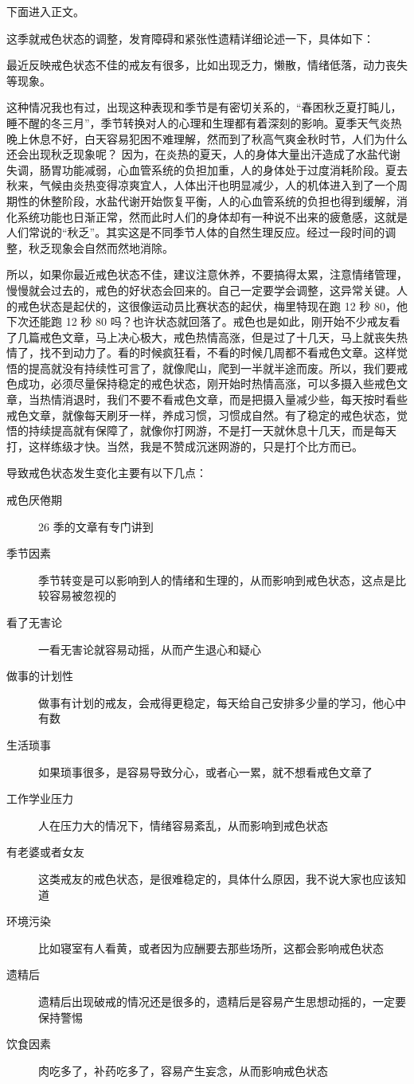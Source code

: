 \documentclass{ctexart}
\begin{document}
下面进入正文。

这季就戒色状态的调整，发育障碍和紧张性遗精详细论述一下，具体如下：

最近反映戒色状态不佳的戒友有很多，比如出现乏力，懒散，情绪低落，动力丧失等现象。

这种情况我也有过，出现这种表现和季节是有密切关系的，“春困秋乏夏打盹儿，睡不醒的冬三月”，季节转换对人的心理和生理都有着深刻的影响。夏季天气炎热晚上休息不好，白天容易犯困不难理解，然而到了秋高气爽金秋时节，人们为什么还会出现秋乏现象呢？ 因为，在炎热的夏天，人的身体大量出汗造成了水盐代谢失调，肠胃功能减弱，心血管系统的负担加重，人的身体处于过度消耗阶段。夏去秋来，气候由炎热变得凉爽宜人，人体出汗也明显减少，人的机体进入到了一个周期性的休整阶段，水盐代谢开始恢复平衡，人的心血管系统的负担也得到缓解，消化系统功能也日渐正常，然而此时人们的身体却有一种说不出来的疲惫感，这就是人们常说的“秋乏”。其实这是不同季节人体的自然生理反应。经过一段时间的调整，秋乏现象会自然而然地消除。

所以，如果你最近戒色状态不佳，建议注意休养，不要搞得太累，注意情绪管理，慢慢就会过去的，戒色的好状态会回来的。自己一定要学会调整，这异常关键。人的戒色状态是起伏的，这很像运动员比赛状态的起伏，梅里特现在跑 12 秒 80，他下次还能跑 12 秒 80 吗？也许状态就回落了。戒色也是如此，刚开始不少戒友看了几篇戒色文章，马上决心极大，戒色热情高涨，但是过了十几天，马上就丧失热情了，找不到动力了。看的时候疯狂看，不看的时候几周都不看戒色文章。这样觉悟的提高就没有持续性可言了，就像爬山，爬到一半就半途而废。所以，我们要戒色成功，必须尽量保持稳定的戒色状态，刚开始时热情高涨，可以多摄入些戒色文章，当热情消退时，我们不要不看戒色文章，而是把摄入量减少些，每天按时看些戒色文章，就像每天刷牙一样，养成习惯，习惯成自然。有了稳定的戒色状态，觉悟的持续提高就有保障了，就像你打网游，不是打一天就休息十几天，而是每天打，这样练级才快。当然，我是不赞成沉迷网游的，只是打个比方而已。

导致戒色状态发生变化主要有以下几点：

\begin{description}
    \item [戒色厌倦期] 26 季的文章有专门讲到
    \item [季节因素] 季节转变是可以影响到人的情绪和生理的，从而影响到戒色状态，这点是比较容易被忽视的
    \item [看了无害论] 一看无害论就容易动摇，从而产生退心和疑心
    \item [做事的计划性] 做事有计划的戒友，会戒得更稳定，每天给自己安排多少量的学习，他心中有数
    \item [生活琐事] 如果琐事很多，是容易导致分心，或者心一累，就不想看戒色文章了
    \item [工作学业压力] 人在压力大的情况下，情绪容易紊乱，从而影响到戒色状态
    \item [有老婆或者女友] 这类戒友的戒色状态，是很难稳定的，具体什么原因，我不说大家也应该知道
    \item [环境污染] 比如寝室有人看黄，或者因为应酬要去那些场所，这都会影响戒色状态
    \item [遗精后] 遗精后出现破戒的情况还是很多的，遗精后是容易产生思想动摇的，一定要保持警惕
    \item [饮食因素] 肉吃多了，补药吃多了，容易产生妄念，从而影响戒色状态
\end{description}
\end{document}
